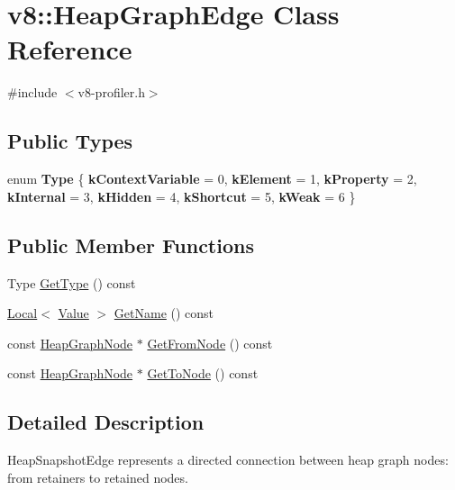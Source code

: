 \hypertarget{classv8_1_1HeapGraphEdge}{}\section{v8\+:\+:Heap\+Graph\+Edge Class Reference}
\label{classv8_1_1HeapGraphEdge}


{\ttfamily \#include $<$v8-\/profiler.\+h$>$}

\subsection*{Public Types}
\begin{DoxyCompactItemize}
\item 
\mbox{\label{classv8_1_1HeapGraphEdge_a252500cf4307fe9e4fcb0335a907259b}} 
enum {\bfseries Type} \{ \newline
{\bfseries k\+Context\+Variable} = 0, 
{\bfseries k\+Element} = 1, 
{\bfseries k\+Property} = 2, 
{\bfseries k\+Internal} = 3, 
\newline
{\bfseries k\+Hidden} = 4, 
{\bfseries k\+Shortcut} = 5, 
{\bfseries k\+Weak} = 6
 \}
\end{DoxyCompactItemize}
\subsection*{Public Member Functions}
\begin{DoxyCompactItemize}
\item 
Type \mbox{\hyperlink{classv8_1_1HeapGraphEdge_a3d860b6d7cc571f2de369f8e9e9a6827}{Get\+Type}} () const
\item 
\mbox{\hyperlink{classv8_1_1Local}{Local}}$<$ \mbox{\hyperlink{classv8_1_1Value}{Value}} $>$ \mbox{\hyperlink{classv8_1_1HeapGraphEdge_af37de5a69827bdb0faaa215b9a6542d9}{Get\+Name}} () const
\item 
const \mbox{\hyperlink{classv8_1_1HeapGraphNode}{Heap\+Graph\+Node}} $\ast$ \mbox{\hyperlink{classv8_1_1HeapGraphEdge_a3b45afb4502d730d9b97f41a104d5e17}{Get\+From\+Node}} () const
\item 
const \mbox{\hyperlink{classv8_1_1HeapGraphNode}{Heap\+Graph\+Node}} $\ast$ \mbox{\hyperlink{classv8_1_1HeapGraphEdge_a30120b9a5bfd427555bca63b4c3ed106}{Get\+To\+Node}} () const
\end{DoxyCompactItemize}


\subsection{Detailed Description}
Heap\+Snapshot\+Edge represents a directed connection between heap graph nodes\+: from retainers to retained nodes. 

